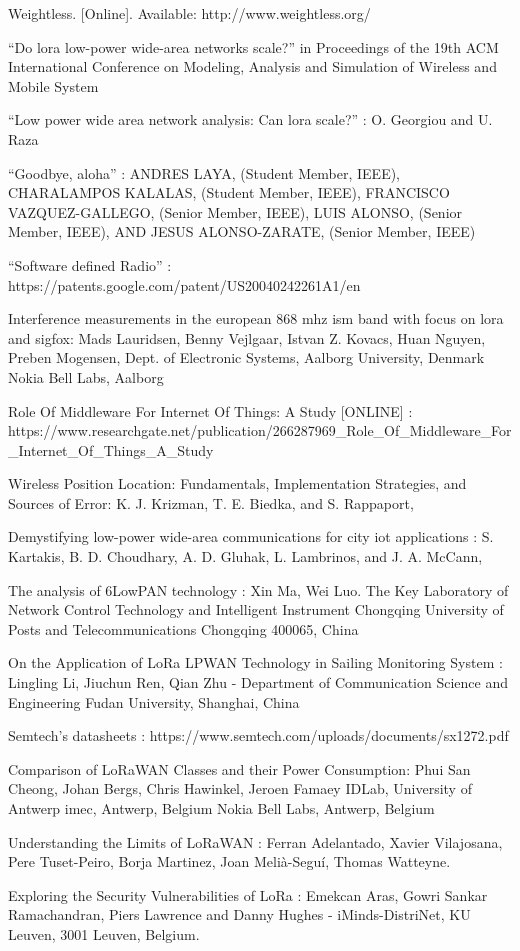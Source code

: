 \documentclass[12pt,a4paper,openright,twoside]{report}
\begin{document}
\begin{thebibliography}{90}
 Weightless. [Online]. Available: http://www.weightless.org/

 ``Do lora low-power wide-area networks scale?'' in Proceedings of the 19th
ACM International Conference on Modeling, Analysis and Simulation
of Wireless and Mobile System 

 ``Low power wide area network analysis: Can lora scale?'' : O. Georgiou and U. Raza


 ``Goodbye, aloha'' : ANDRES LAYA, (Student Member, IEEE), CHARALAMPOS KALALAS, (Student Member, IEEE), FRANCISCO VAZQUEZ-GALLEGO, (Senior Member, IEEE), LUIS ALONSO, (Senior Member, IEEE), AND JESUS ALONSO-ZARATE, (Senior Member, IEEE)

 ``Software defined Radio'' :  https://patents.google.com/patent/US20040242261A1/en

 Interference measurements in the european 868 mhz ism band with focus on lora and sigfox: Mads Lauridsen, Benny Vejlgaar, Istvan Z. Kovacs, Huan Nguyen, Preben Mogensen, Dept. of Electronic Systems, Aalborg University, Denmark Nokia Bell Labs, Aalborg

 Role Of Middleware For Internet Of Things: A Study [ONLINE] : 
https://www.researchgate.net/publication/266287969\_Role\_Of\_Middleware\_For\_Internet\_Of\_Things\_A\_Study
				
 Wireless Position Location: Fundamentals, Implementation Strategies, and Sources of Error: K. J. Krizman, T. E. Biedka, and S. Rappaport,

 Demystifying low-power wide-area communications for city iot applications : 
S. Kartakis, B. D. Choudhary, A. D. Gluhak, L. Lambrinos, and J. A. McCann,

 The analysis of 6LowPAN technology : Xin Ma, Wei Luo. The Key Laboratory of Network Control Technology and Intelligent Instrument Chongqing University of Posts and Telecommunications Chongqing 400065, China

On the Application of LoRa LPWAN Technology in Sailing Monitoring System : 	
Lingling Li, Jiuchun Ren, Qian Zhu - Department of Communication Science and Engineering
Fudan University, Shanghai, China

 Semtech's datasheets : https://www.semtech.com/uploads/documents/sx1272.pdf  

 Comparison of LoRaWAN Classes and their Power Consumption: Phui San Cheong, Johan Bergs, Chris Hawinkel, Jeroen Famaey IDLab, University of Antwerp imec, Antwerp, Belgium Nokia Bell Labs, Antwerp, Belgium

 Understanding the Limits of LoRaWAN : Ferran Adelantado, Xavier Vilajosana, Pere Tuset-Peiro, Borja Martinez, Joan Melià-Seguí, Thomas Watteyne.

 Exploring the Security Vulnerabilities of LoRa :  Emekcan Aras, Gowri Sankar Ramachandran, Piers Lawrence and Danny Hughes - iMinds-DistriNet, KU Leuven, 3001 Leuven, Belgium.



\end{thebibliography}
\end{document}
